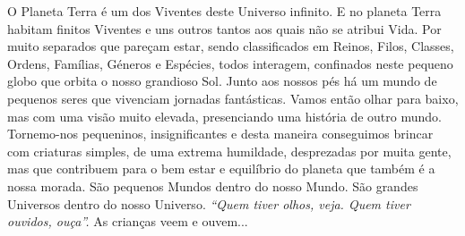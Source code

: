O Planeta Terra é um dos Viventes deste Universo infinito.
\bigbreak
E no planeta Terra habitam finitos Viventes e uns outros tantos aos quais não se atribui Vida.
\bigbreak
Por muito separados que pareçam estar, sendo classificados em Reinos, Filos, Classes, Ordens, Famílias, Géneros e Espécies, todos interagem, confinados neste pequeno globo que orbita o nosso grandioso Sol.
\bigbreak
Junto aos nossos pés há um mundo de pequenos seres que vivenciam jornadas fantásticas.
\bigbreak
Vamos então olhar para baixo, mas com uma visão muito elevada, presenciando uma história de outro mundo.
\bigbreak
Tornemo-nos pequeninos, insignificantes e desta maneira conseguimos brincar com criaturas simples, de uma extrema humildade, desprezadas por muita gente, mas que contribuem para o bem estar e equilíbrio do planeta que também é a nossa morada.
\bigbreak
São pequenos Mundos dentro do nosso Mundo. São grandes Universos dentro do nosso Universo.
\bigbreak
\emph{“Quem tiver olhos, veja. Quem tiver ouvidos, ouça”.}
\bigbreak
As crianças veem e ouvem...